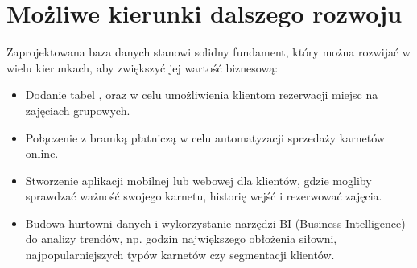 \documentclass[letterpaper,10pt,polish]{sphinxmanual}
\begin{document}
\section{Możliwe kierunki dalszego rozwoju}
\label{\detokenize{rozdzial5/rozdzial5:mozliwe-kierunki-dalszego-rozwoju}}
\sphinxAtStartPar
Zaprojektowana baza danych stanowi solidny fundament, który można rozwijać w wielu kierunkach, aby zwiększyć jej wartość biznesową:
\begin{itemize}
\item {} 
\sphinxAtStartPar
{} Dodanie tabel ,  oraz  w celu umożliwienia klientom rezerwacji miejsc na zajęciach grupowych.

\item {} 
\sphinxAtStartPar
{} Połączenie z bramką płatniczą w celu automatyzacji sprzedaży karnetów online.

\item {} 
\sphinxAtStartPar
{} Stworzenie aplikacji mobilnej lub webowej dla klientów, gdzie mogliby sprawdzać ważność swojego karnetu, historię wejść i rezerwować zajęcia.

\item {} 
\sphinxAtStartPar
{} Budowa hurtowni danych i wykorzystanie narzędzi BI (Business Intelligence) do analizy trendów, np. godzin największego obłożenia siłowni, najpopularniejszych typów karnetów czy segmentacji klientów.

\end{itemize}
\end{document}
